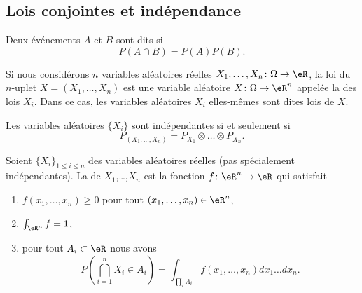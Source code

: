 \subsection{Lois conjointes et indépendance}

\begin{definition}
    Deux événements \( A\) et \( B\) sont dits  si
    \begin{equation}
        P(A\cap B)=P(A)P(B).
    \end{equation}
\end{definition}
Si nous considérons \( n\) variables aléatoires réelles \( X_1,\ldots,X_n\colon\Omega\to\eR\), la loi du \( n\)-uplet \( X=(X_1,\ldots,X_n)\) est une variable aléatoire \( X\colon \Omega\to \eR^n\) appelée la  des lois \( X_i\). Dans ce cas, les variables aléatoires \( X_i\) elles-mêmes sont dites lois  de \( X\).

\begin{proposition}     \label{PropPXXXPXPXPX}
    Les variables aléatoires \( \{ X_i \}\) sont indépendantes si et seulement si
    \begin{equation}
        P_{(X_1,\ldots,X_n)}=P_{X_1}\otimes\ldots\otimes P_{X_n}.
    \end{equation}
\end{proposition}

\begin{definition}      \label{DefFonrepConj}
    Soient \( \{ X_i \}_{1\leq i\leq n}\) des variables aléatoires réelles (pas spécialement indépendantes). La  de \( X_1\),\ldots,\( X_n\) est la fonction \( f\colon \eR^n\to \eR\) qui satisfait
    \begin{enumerate}
        \item
            \( f(x_1,\ldots,x_n)\geq 0\) pour tout \( (x_1,\ldots,x_n)\in\eR^n\),
        \item
            \( \int_{\eR^n}f=1\),
        \item       \label{ItemDefFonrepConjiii}
            pour tout \( A_i\subset\eR \) nous avons
            \begin{equation}
                P(\bigcap_{i=1}^n X_i\in A_i)=\int_{\prod_i A_i}f(x_1,\ldots,x_n)dx_1\ldots dx_n.
            \end{equation}
    \end{enumerate}
\end{definition}

